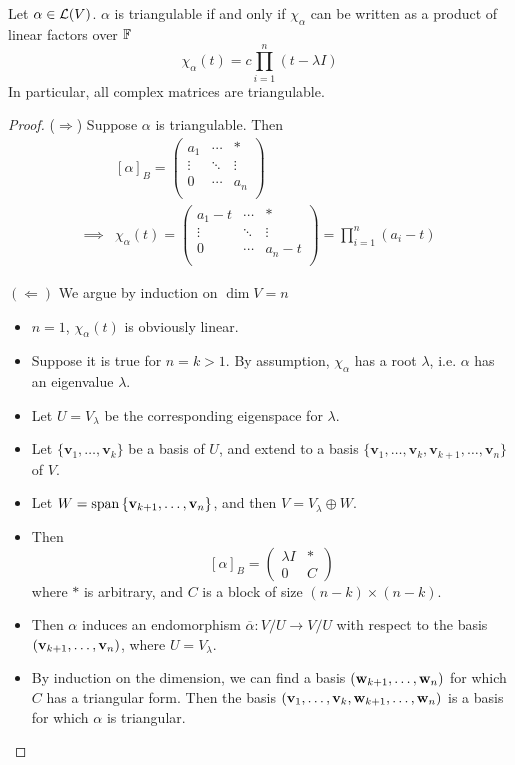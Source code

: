 \documentclass[a4paper]{article}
\begin{document}
\begin{theorem}\label{thm:test if triangulable}
	Let $ \alpha \in {\mathcal{L}}(V) $.
	$ \alpha $ is triangulable if and only if $ \chi_\alpha $ can be written as a product of linear factors over $ {\mathbb{F}} $ 
	\[
		\chi_\alpha(t) = c \prod_{i=1}^{n}(t-\lambda I)
	\]
	In particular, all complex matrices are triangulable.
\end{theorem}
\begin{proof}
	($\Rightarrow$) Suppose $\alpha$ is triangulable. Then 
	\begin{align*}
		& [\alpha]_B = \begin{pmatrix}
			a_1 & \cdots &  * \\
			\vdots  & \ddots  &  \vdots  \\
			0 & \cdots  &  a_n \\
		\end{pmatrix}\\ 
		\implies & \chi_\alpha(t) = \begin{pmatrix}
			a_1-t & \cdots &  * \\
			\vdots  & \ddots  &  \vdots  \\
			0 & \cdots  &  a_n-t \\
		\end{pmatrix} = \prod_{i=1}^{n} (a_i - t)
	\end{align*}

	$(\Leftarrow)$ We argue by induction on $ \dim V = n $ 
	\begin{itemize}
		\item $n=1$, $ \chi_\alpha(t) $ is obviously linear.
		\item Suppose it is true for $n=k>1$. By assumption, $ \chi_\alpha $ has a root $ \lambda $, i.e. $\alpha$ has an eigenvalue $\lambda$. 
		\item Let $U = V_\lambda$ be the corresponding eigenspace for $\lambda$. 
		\item Let $ \{\mathbf{v}_1,\dots,\mathbf{v}_k\} $ be a basis of $U$, and extend to a basis $ \{\mathbf{v}_1,\dots,\mathbf{v}_k,\mathbf{v}_{k+1},\dots,\mathbf{v}_n\} $ of $V$. 
		\item Let $ W = \operatorname{span}\qty{{\bf v}_{k+1}, \dots, {\bf v}_n} $, and then $ V = V_\lambda \oplus W $.
		\item Then
		\[
			[\alpha]_B = \begin{pmatrix}
				\lambda I & * \\
				0         & C
			\end{pmatrix}
		\]
		where $ * $ is arbitrary, and $ C $ is a block of size $ (n-k) \times (n-k) $.
		\item Then $ \alpha $ induces an endomorphism $ \overline \alpha \colon V/U \to V/U $ with respect to the basis $ ({\bf v}_{k+1}, \dots, {\bf v}_n) $, where $ U = V_\lambda $.
		\item By induction on the dimension, we can find a basis $ ({\bf w}_{k+1}, \dots, {\bf w}_n) $ for which $ C $ has a triangular form.
		Then the basis $ ({\bf v}_1, \dots, \mathbf{v}_k, {\bf w}_{k+1}, \dots, {\bf w}_n) $ is a basis for which $ \alpha $ is triangular.
	\end{itemize}
\end{proof}
\end{document}
